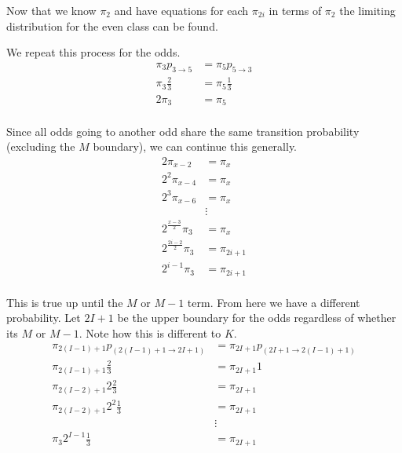 \documentclass{article}
\begin{document}
Now that we know $\pi_2$ and have equations for each $\pi_{2i}$ in terms of
$\pi_2$ the limiting distribution for the even class can be found.

We repeat this process for the odds.
\begin{align*}
    \pi_3 p_{3 \to 5} &= \pi_5 p_{5 \to 3} \\
    \pi_3 \frac{2}{3} &= \pi_5 \frac{1}{3} \\
    2 \pi_3 &= \pi_5 \\
\end{align*}

Since all odds going to another odd share the same transition probability
(excluding the $M$ boundary),
we can continue this generally.
\begin{align*}
    2 \pi_{x-2} &= \pi_x \\
    2^2 \pi_{x-4} &= \pi_x \\
    2^3 \pi_{x-6} &= \pi_x \\
    &\vdots \\
    2^{\frac{x-3}{2}} \pi_{3} &= \pi_x \\
    2^{\frac{2i-2}{2}} \pi_{3} &= \pi_{2i+1} \\
    2^{i-1} \pi_{3} &= \pi_{2i+1} \\
\end{align*}

This is true up until the $M$ or $M-1$ term. From here we have a different
probability. Let $2I+1$ be the upper boundary for the odds regardless of whether
its $M$ or $M-1$. Note how this is different to $K$.
\begin{align*}
    \pi_{2(I-1)+1} p_{(2(I-1)+1 \to 2I+1)} &= \pi_{2I+1} p_{(2I+1 \to 2(I-1)+1)} \\
    \pi_{2(I-1)+1} \frac{2}{3} &= \pi_{2I+1} 1 \\
    \pi_{2(I-2)+1} 2 \frac{2}{3} &= \pi_{2I+1} \\
    \pi_{2(I-2)+1} 2^2 \frac{1}{3} &= \pi_{2I+1} \\
    &\vdots \\
    \pi_3 2^{I-1} \frac{1}{3} &= \pi_{2I+1} \\
\end{align*}
\end{document}
